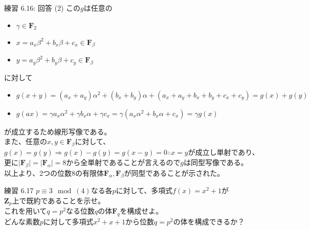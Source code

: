 \documentclass[dvipdfmx,10pt,jsarticle]{beamer}
\begin{document}
  \begin{frame}{練習 6.16: 回答 (2)}
    この$g$は任意の
    \begin{itemize}
      \item $\gamma \in \mathbf{F}_2$
      \item $x = a_x \beta^2 + b_x \beta + c_x \in \mathbf{F}_\beta$
      \item $y = a_y \beta^2 + b_y \beta + c_y \in \mathbf{F}_\beta$
    \end{itemize}
    に対して
    \begin{itemize}
      \item $ g(x + y) = (a_x + a_y) \alpha^2 + (b_x + b_y) \alpha + (a_x + a_y + b_x + b_y + c_x + c_y) = g(x) + g(y) $
      \item $ g(a x) = \gamma a_x \alpha^2 + \gamma b_x \alpha + \gamma c_x = \gamma(a_x \alpha^2 + b_x \alpha + c_x) = \gamma g(x) $
    \end{itemize}
    が成立するため線形写像である。\\
    また、任意の$x,y \in \mathbf{F}_\beta$に対して、$g(x) = g(y) \Rightarrow g(x) - g(y) = g(x - y) = 0 \therefore x = y$が成立し単射であり、\\
    更に$\mid \mathbf{F}_\beta \mid = \mid \mathbf{F}_\alpha \mid = 8$から全単射であることが言えるので$g$は同型写像である。 \\
    以上より、2つの位数8の有限体$\mathbf{F}_\alpha, \mathbf{F}_\beta$が同型であることが示された。

  \end{frame}

  \begin{frame}{練習 6.17}
    $p \equiv 3 \mod (4)$なる各$p$に対して、多項式$f(x) = x^2 + 1$が\\ $\mathbf{Z}_p$上で既約であることを示せ。\\
    これを用いて$q = p^2$なる位数$q$の体$\mathbf{F}_q$を構成せよ。\\
    どんな素数$p$に対して多項式$x^2 + x + 1$から位数$q = p^2$の体を構成できるか？
  \end{frame}
\end{document}
